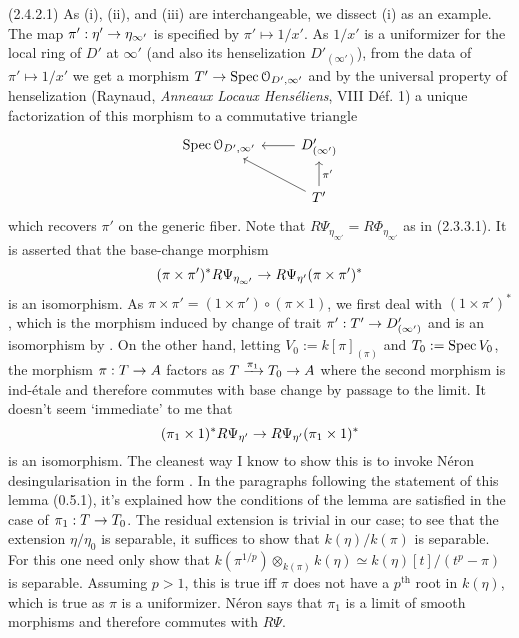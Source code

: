 \documentclass[deligne.tex]{subfiles}
\begin{document}
(2.4.2.1) As (i), (ii), and (iii) are interchangeable, we dissect (i)
as an example.
The map $\pi':\eta'\rightarrow\eta_{\infty'}$ is specified by
$\pi'\mapsto1/x'$. As $1/x'$ is a uniformizer for the local ring of $D'$
at $\infty'$ (and also its henselization $D'_{(\infty')}$), from the data 
of $\pi'\mapsto1/x'$ we get a morphism $T'\rightarrow\operatorname{Spec}\mathcal O_{D',\infty'}$
and by the universal property of henselization
(Raynaud, \emph{Anneaux Locaux Henséliens}, VIII Déf. 1) a unique
factorization of this morphism to a commutative triangle
\begin{equation*}\begin{tikzcd}
	\Spec\mathcal O_{D',\infty'}&D'_{(\infty')}\arrow[l] \\
	&T'\arrow[ul]\arrow[u,"\pi'"']
\end{tikzcd}\end{equation*}
which recovers $\pi'$ on the generic fiber.
Note that $R\Psi_{\eta_{\infty'}}=R\Phi_{\eta_{\infty'}}$ as in (2.3.3.1).
It is asserted that the base-change morphism
\begin{equation*}
	(\pi\times\pi')^*R\Psi_{\eta_{\infty'}}\rightarrow
	R\Psi_{\eta'}(\pi\times\pi')^*
\end{equation*}
is an isomorphism. As $\pi\times\pi'=(1\times\pi')\circ(\pi\times1)$, we
first deal with $(1\times\pi')^*$, which is the morphism induced by change
of trait $\pi':T'\rightarrow D'_{(\infty')}$ and is an isomorphism by
\cite[3.7]{thfin}.
On the other hand, letting $V_0:=k[\pi]_{(\pi)}$ and $T_0:=\operatorname{Spec} V_0$, the
morphism $\pi:T\rightarrow A$ factors as $T\xrightarrow{\pi_1}T_0\rightarrow A$ where the second
morphism is ind-étale and therefore commutes with base change by passage to 
the limit. It doesn't seem `immediate' to me that
\begin{equation*}
	(\pi_1\times1)^*R\Psi_{\eta'}\rightarrow
	R\Psi_{\eta'}(\pi_1\times1)^*
\end{equation*}
is an isomorphism. The cleanest way I know to show this is to
invoke Néron desingularisation in the form \cite[I 0.5.1]{SGA7}.
In the paragraphs following the statement of this lemma (0.5.1),
it's explained how the conditions of the lemma are satisfied in the case of
$\pi_1:T\rightarrow T_0$. The residual extension is trivial in our case; to see
that the extension $\eta/\eta_0$ is separable, it suffices to show that
$k(\eta)/k(\pi)$ is separable. For this one need only show that
$k(\pi^{1/p})\otimes_{k(\pi)}k(\eta)\simeq k(\eta)[t]/(t^p-\pi)$ is
separable. Assuming $p>1$, this is true iff $\pi$ does not have a
$p^{\text{th}}$ root in $k(\eta)$, which is true as $\pi$ is a uniformizer.
Néron says that $\pi_1$ is a limit of smooth morphisms and therefore
commutes with $R\Psi$.
\end{document}
